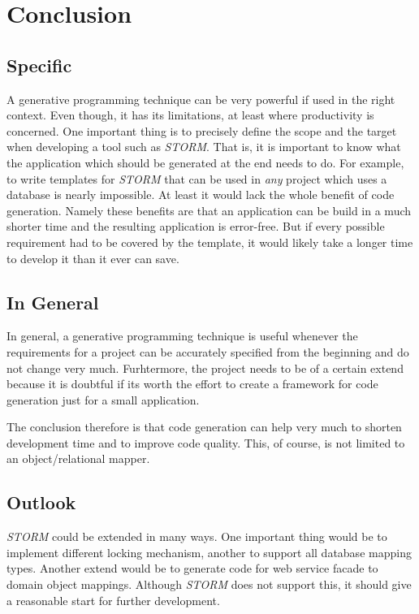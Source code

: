 \chapter{Conclusion}
	\section{Specific}
	A generative programming technique can be very powerful if used in the right context.
	Even though, it has its limitations, at least where productivity
	is concerned. One important thing is to precisely
	define the scope and the target when developing a tool such as \textit{STORM}.
	That is, it is important to know what the application which should be generated at the
	end needs to do. For example, to write templates for \textit{STORM} that can be used in 
	\emph{any} project which uses a database is nearly impossible. At least it would lack the
	whole benefit of code generation. Namely these benefits are that an application
	can be build in a much shorter time and the resulting application is error-free.
	But if every possible requirement had to be covered by the template, it would
	likely take a longer time to develop it than it ever can save.
	
	\section{In General}
	In general, a generative programming technique is useful whenever the 
	requirements for a project can be accurately specified from the beginning
	and do not change very much. Furhtermore, the project needs to be of
	a certain extend because it is doubtful if its worth the effort to create
	a framework for code generation just for a small application.
	
	The conclusion therefore is that code generation can help very much to shorten
	development time and to improve code quality. This, of course, is not limited
	to an object/relational mapper.
	
	\section{Outlook}
	\textit{STORM} could be extended in many ways. One important thing would be
	to implement different locking mechanism, another to support all database
	mapping types. Another extend would be to generate code for web service facade
	to domain object mappings.
	Although \textit{STORM} does not support this, it should give a reasonable start 
	for further development. 